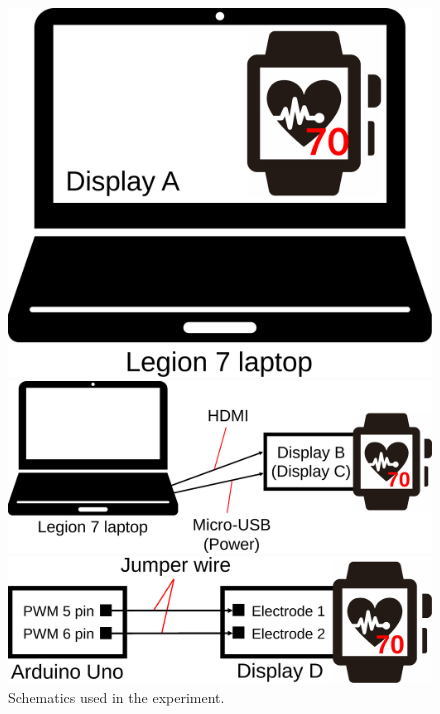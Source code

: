 \documentclass{ieeeaccess}
\begin{document}
\begin{figure}[!t]
  \centering
  \begin{minipage}[t]{1\linewidth}
    \centering
    \includegraphics[width=0.5\linewidth]{figures/display_a.eps}
    \vspace{10pt}
  \end{minipage}
  \begin{minipage}[t]{1\linewidth}
    \centering
    \includegraphics[width=1\linewidth]{figures/display_b_c.eps}
    \vspace{10pt}
  \end{minipage}
  \begin{minipage}[t]{1\linewidth}
    \centering
    \includegraphics[width=1\linewidth]{figures/display_d.eps}
  \end{minipage}
  \caption{Schematics used in the experiment.}
  \label{fig:schematic}
\end{figure}
\end{document}
